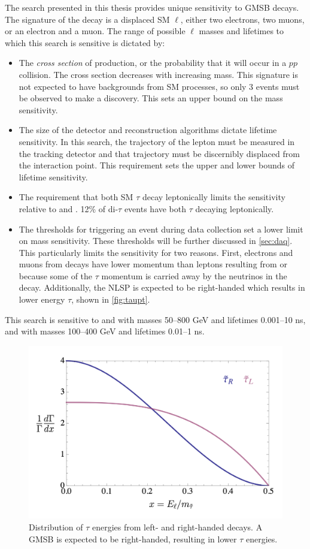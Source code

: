 The search presented in this thesis provides unique sensitivity to \ac{GMSB} \slep decays. The signature of the decay is a displaced \ac{SM} $\ell$, either two electrons, two muons, or an electron and a muon. The range of possible $\ell$ masses and lifetimes to which this search is sensitive is dictated by:
\begin{itemize}
	\item The \emph{cross section} of \slep production, or the probability that it will occur in a $pp$ collision. The cross section decreases with increasing \slep mass. This signature is not expected to have backgrounds from \ac{SM} processes, so only 3 events must be observed to make a discovery. This sets an upper bound on the mass sensitivity.
	\item The size of the detector and reconstruction algorithms dictate lifetime sensitivity. In this search, the trajectory of the lepton must be measured in the tracking detector and that trajectory must be discernibly displaced from the interaction point. This requirement sets the upper and lower bounds of lifetime sensitivity.
	\item The requirement that both \ac{SM} $\tau$ decay leptonically limits the \stau sensitivity relative to \selec and \smu. 12\% of di-$\tau$ events have both $\tau$ decaying leptonically. 
	\item The thresholds for triggering an event during data collection set a lower limit on mass sensitivity. These thresholds will be further discussed in \autoref{sec:daq}. This particularly limits the \stau sensitivity for two reasons. First, electrons and muons from \stau decays have lower momentum than leptons resulting from \selec or \smu because some of the $\tau$ momentum is carried away by the neutrinos in the decay. Additionally, the \stau \ac{NLSP} is expected to be right-handed which results in lower energy $\tau$, shown in \autoref{fig:taupt}. 
\end{itemize}



This search is sensitive to \selec and \smu with masses 50--800 GeV and lifetimes 0.001--10 ns, and \stau with masses 100--400 GeV and lifetimes 0.01--1 ns.

\begin{figure}[!h]
\centering
\includegraphics[width=.7\textwidth]{figures/theory/tau-pt.png}
\caption{Distribution of $\tau$ energies from left- and right-handed \stau decays. A \ac{GMSB} \stau is expected to be right-handed, resulting in lower $\tau$ energies. \cite{jesseshelton}}
\label{fig:taupt}
\end{figure}

